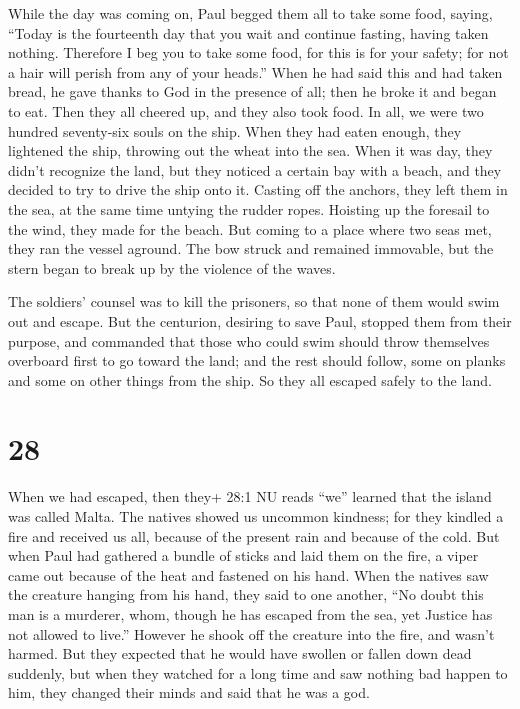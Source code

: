  While the day was coming on, Paul begged them all to take
some food, saying, ``Today is the fourteenth day that you wait and
continue fasting, having taken nothing.  Therefore I beg
you to take some food, for this is for your safety; for not a hair will
perish from any of your heads.''  When he had said this and
had taken bread, he gave thanks to God in the presence of all; then he
broke it and began to eat.  Then they all cheered up, and
they also took food.  In all, we were two hundred
seventy-six souls on the ship.  When they had eaten enough,
they lightened the ship, throwing out the wheat into the sea.
 When it was day, they didn't recognize the land, but they
noticed a certain bay with a beach, and they decided to try to drive the
ship onto it.  Casting off the anchors, they left them in
the sea, at the same time untying the rudder ropes. Hoisting up the
foresail to the wind, they made for the beach.  But coming
to a place where two seas met, they ran the vessel aground. The bow
struck and remained immovable, but the stern began to break up by the
violence of the waves.

 The soldiers' counsel was to kill the prisoners, so that
none of them would swim out and escape.  But the centurion,
desiring to save Paul, stopped them from their purpose, and commanded
that those who could swim should throw themselves overboard first to go
toward the land;  and the rest should follow, some on
planks and some on other things from the ship. So they all escaped
safely to the land.

\hypertarget{section-27}{%
\section{28}\label{section-27}}

 When we had escaped, then they+ 28:1 NU reads ``we''
learned that the island was called Malta.  The natives
showed us uncommon kindness; for they kindled a fire and received us
all, because of the present rain and because of the cold. 
But when Paul had gathered a bundle of sticks and laid them on the fire,
a viper came out because of the heat and fastened on his hand.
 When the natives saw the creature hanging from his hand,
they said to one another, ``No doubt this man is a murderer, whom,
though he has escaped from the sea, yet Justice has not allowed to
live.''  However he shook off the creature into the fire,
and wasn't harmed.  But they expected that he would have
swollen or fallen down dead suddenly, but when they watched for a long
time and saw nothing bad happen to him, they changed their minds and
said that he was a god.

